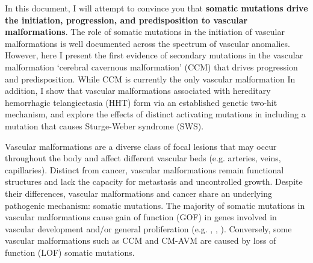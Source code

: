 \abstract

In this document, I will attempt to convince you that \textbf{somatic mutations drive the initiation, progression, and predisposition to vascular malformations}. The role of somatic mutations in the initiation of vascular malformations is well documented across the spectrum of vascular anomalies. However, here I present the first evidence of secondary mutations in the vascular malformation `cerebral cavernous malformation' (CCM) that drives progression and predisposition. While CCM is currently the only vascular malformation In addition, I show that vascular malformations associated with hereditary hemorrhagic telangiectasia (HHT) form via an established genetic two-hit mechanism, and explore the effects of distinct activating mutations in  including a mutation that causes Sturge-Weber syndrome (SWS). 

Vascular malformations are a diverse class of focal lesions that may occur throughout the body and affect different vascular beds (e.g. arteries, veins, capillaries). Distinct from cancer, vascular malformations remain functional structures and lack the capacity for metastasis and uncontrolled growth. Despite their differences, vascular malformations and cancer share an underlying pathogenic mechanism: somatic mutations. The majority of somatic mutations in vascular malformations cause gain of function (GOF) in genes involved in vascular development and/or general proliferation (e.g. , , ). Conversely, some vascular malformations such as CCM and CM-AVM are caused by loss of function (LOF) somatic mutations. 